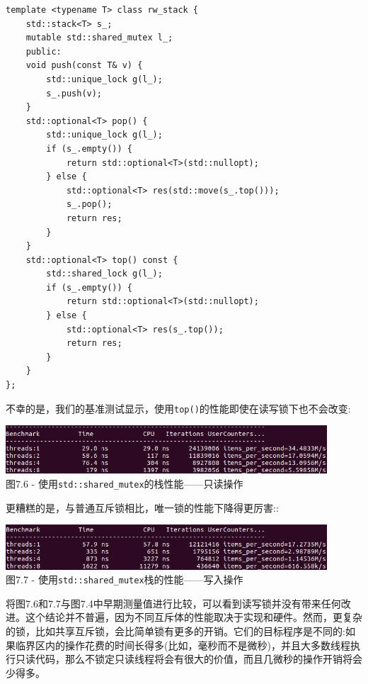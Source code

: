 \begin{lstlisting}[style=styleCXX]
template <typename T> class rw_stack {
	std::stack<T> s_;
	mutable std::shared_mutex l_;
	public:
	void push(const T& v) {
		std::unique_lock g(l_);
		s_.push(v);
	}
	std::optional<T> pop() {
		std::unique_lock g(l_);
		if (s_.empty()) {
			return std::optional<T>(std::nullopt);
		} else {
			std::optional<T> res(std::move(s_.top()));
			s_.pop();
			return res;
		}
	}
	std::optional<T> top() const {
		std::shared_lock g(l_);
		if (s_.empty()) {
			return std::optional<T>(std::nullopt);
		} else {
			std::optional<T> res(s_.top());
			return res;
		}
	}
};
\end{lstlisting}

不幸的是，我们的基准测试显示，使用\texttt{top()}的性能即使在读写锁下也不会改变:

\begin{center}
\includegraphics[width=0.9\textwidth]{content/2/chapter7/images/6.jpg}\\
图7.6 - 使用\texttt{std::shared\_mutex}的栈性能——只读操作
\end{center}

更糟糕的是，与普通互斥锁相比，唯一锁的性能下降得更厉害::

\begin{center}
\includegraphics[width=0.9\textwidth]{content/2/chapter7/images/7.jpg}\\
图7.7 - 使用\texttt{std::shared\_mutex}栈的性能——写入操作
\end{center}

将图7.6和7.7与图7.4中早期测量值进行比较，可以看到读写锁并没有带来任何改进。这个结论并不普遍，因为不同互斥体的性能取决于实现和硬件。然而，更复杂的锁，比如共享互斥锁，会比简单锁有更多的开销。它们的目标程序是不同的:如果临界区内的操作花费的时间长得多(比如，毫秒而不是微秒)，并且大多数线程执行只读代码，那么不锁定只读线程将会有很大的价值，而且几微秒的操作开销将会少得多。

